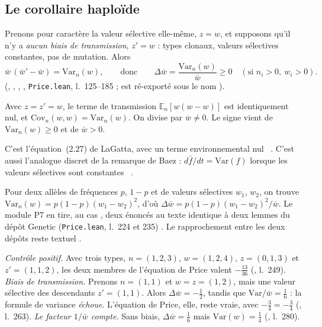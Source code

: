 \subsection{Le corollaire haploïde}
\begin{corollary}\label{ch4:cor:haploide}
Prenons pour caractère la valeur sélective elle-même, $z=w$, et supposons qu'il n'y a \emph{aucun biais de
transmission}, $z'=w$ : types clonaux, valeurs sélectives constantes, pas de mutation. Alors
\[
\bar w\,(\bar w'-\bar w)=\mathrm{Var}_n(w),\qquad\text{donc}\qquad \Delta\bar w=\frac{\mathrm{Var}_n(w)}{\bar w}\ge0
\quad(\text{si }n_i>0,\ w_i>0).
\]
\tierA{} (, , ,
, \texttt{Price.lean}, l.~125--185 ;  est ré-exporté sous le nom ).
\end{corollary}

\begin{humanproof}
Avec $z=z'=w$, le terme de transmission $\mathbb E_n[w(w-w)]$ est identiquement nul, et
$\mathrm{Cov}_n(w,w)=\mathrm{Var}_n(w)$. On divise par $\bar w\ne0$. Le signe vient de $\mathrm{Var}_n(w)\ge0$ et de
$\bar w>0$.
\end{humanproof}

C'est l'équation~(2.27) de LaGatta, avec un terme environnemental nul \tierL{}~\cite{ch4:LaG}. C'est aussi
l'analogue discret de la remarque de Baez : $d\bar f/dt=\mathrm{Var}(f)$ lorsque les valeurs sélectives sont
constantes \tierL{}~\cite{ch4:Bae}.

Pour deux allèles de fréquences $p$, $1-p$ et de valeurs sélectives $w_1$, $w_2$, on trouve
$\mathrm{Var}_n(w)=p(1-p)(w_1-w_2)^2$, d'où $\Delta\bar w=p(1-p)(w_1-w_2)^2/\bar w$. Le module P7 en tire, au
cas , deux énoncés au texte identique à deux lemmes du dépôt Genetic
(\texttt{Price.lean}, l.~224 et 235)
\tierA. Le rapprochement entre les deux dépôts reste textuel \tierC.

\begin{remark}
\emph{Contrôle positif.} Avec trois types, $n=(1,2,3)$, $w=(1,2,4)$, $z=(0,1,3)$ et $z'=(1,1,2)$, les deux membres
de l'équation de Price valent $-\frac{13}{36}$ (, l.~249).
\emph{Biais de transmission.} Prenons $n=(1,1)$ et $w=z=(1,2)$, mais une valeur sélective des descendants
$z'=(1,1)$. Alors $\Delta\bar w=-\frac12$, tandis que $\mathrm{Var}/\bar w=\frac16$ : la formule de variance
\emph{échoue}. L'équation de Price, elle, reste vraie, avec $-\frac34=-\frac34$ (,
l.~263).
\emph{Le facteur $1/\bar w$ compte.} Sans biais, $\Delta\bar w=\frac16$ mais $\mathrm{Var}(w)=\frac14$
(, l.~280).
\end{remark}

